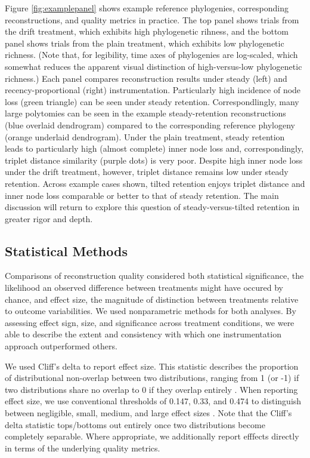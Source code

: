 

Figure \ref{fig:examplepanel} shows example reference phylogenies, corresponding reconstructions, and quality metrics in practice.
The top panel shows trials from the drift treatment, which exhibits high phylogenetic rihness, and the bottom panel shows trials from the plain treatment, which exhibits low phylogenetic richness.
(Note that, for legibility, time axes of phylogenies are log-scaled, which somewhat reduces the apparent visual distinction of high-versus-low phylogenetic richness.)
Each panel compares reconstruction results under steady (left) and recency-proportional (right) instrumentation.
Particularly high incidence of node loss (green triangle) can be seen under steady retention.
Correspondlingly, many large polytomies can be seen in the example steady-retention reconstructions (blue overlaid dendrogram) compared to the corresponding reference phylogeny (orange underlaid dendrogram).
Under the plain treatment, steady retention leads to particularly high (almost complete) inner node loss and, correspondingly, triplet distance similarity (purple dots) is very poor.
Despite high inner node loss under the drift treatment, however, triplet distance remains low under steady retention.
Across example cases shown, tilted retention enjoys triplet distance and inner node loss comparable or better to that of steady retention.
The main discussion will return to explore this question of steady-versus-tilted retention in greater rigor and depth.

\subsection{Statistical Methods}

Comparisons of reconstruction quality considered both statistical significance, the likelihood an observed difference between treatments might have occured by chance, and effect size, the magnitude of distinction between treatments relative to outcome variabilities.
We used nonparametric methods for both analyses.
By assessing effect sign, size, and significance across treatment conditions, we were able to describe the extent and consistency with which one instrumentation approach outperformed others.

We used Cliff's delta to report effect size.
This statistic describes the proportion of distributional non-overlap between two distributions, ranging from 1 (or -1) if two distributions share no overlap to 0 if they overlap entirely \citep{cliff1993dominance}.
When reporting effect size, we use conventional thresholds of 0.147, 0.33, and 0.474 to distinguish between negligible, small, medium, and large effect sizes \citep{hess2004robust}.
Note that the Cliff's delta statistic tops/bottoms out entirely once two distributions become completely separable.
Where appropriate, we additionally report efffects directly in terms of the underlying quality metrics.


